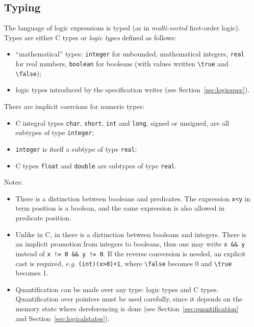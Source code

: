 \subsection{Typing}\label{sec:typing}

The language of logic expressions is typed (as in \emph{multi-sorted}
first-order logic). Types are either C types or \emph{logic types}
defined as follows:
\begin{itemize}
\item ``mathematical'' types: \lstinline|integer| for
  unbounded, mathematical integers, \lstinline|real| for
  real numbers, \lstinline|boolean| for booleans (with
  values written \lstinline|\true| and
  \lstinline|\false|);
\item logic types introduced by the specification writer (see
  Section~\ref{sec:logicspec}).
\end{itemize}
There are implicit coercions for numeric types:
\begin{itemize}
\item C integral types \lstinline|char|, \lstinline|short|, \lstinline|int| and
  \lstinline|long|, signed or unsigned, are all subtypes of type
\lstinline|integer|;
\item \lstinline|integer| is itself a subtype of type \lstinline|real|;
\item C types \lstinline|float| and \lstinline|double| are subtypes of
  type \lstinline|real|.
\end{itemize}
Notes:
\begin{itemize}
\item There is a distinction between booleans and predicates. The
  expression \lstinline|x<y| in term position is a boolean, and the
  same expression
  is also allowed in predicate position.
\item Unlike in C, in \NAME there is a distinction between booleans and
  integers. There is an implicit promotion from integers to booleans,
  thus one may write \lstinline|x && y| instead of \lstinline|x != 0 && y != 0|.
  If the reverse conversion is needed, an explicit cast is
  required, \emph{e.g.} \lstinline|(int)(x>0)+1|, where
  \lstinline|\false| becomes 0
  and \lstinline|\true| becomes 1.
\item Quantification can be made over any type: logic types and C
  types. Quantification over pointers must be used carefully,
  since it depends on the memory state where dereferencing is done (see
  Section~\ref{sec:quantification} and
  Section~\ref{sec:logicalstates}).
\end{itemize}

